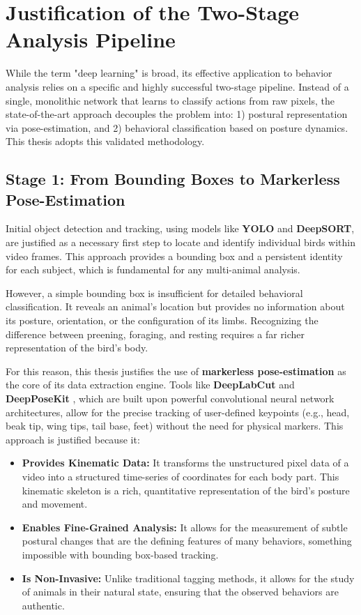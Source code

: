 \section{Justification of the Two-Stage Analysis Pipeline}

While the term "deep learning" is broad, its effective application to behavior analysis relies on a specific and highly successful two-stage pipeline. Instead of a single, monolithic network that learns to classify actions from raw pixels, the state-of-the-art approach decouples the problem into: 1) postural representation via pose-estimation, and 2) behavioral classification based on posture dynamics. This thesis adopts this validated methodology.

\subsection{Stage 1: From Bounding Boxes to Markerless Pose-Estimation}
Initial object detection and tracking, using models like \textbf{YOLO} and \textbf{DeepSORT}, are justified as a necessary first step to locate and identify individual birds within video frames. This approach provides a bounding box and a persistent identity for each subject, which is fundamental for any multi-animal analysis.

However, a simple bounding box is insufficient for detailed behavioral classification. It reveals an animal's location but provides no information about its posture, orientation, or the configuration of its limbs. Recognizing the difference between preening, foraging, and resting requires a far richer representation of the bird's body.

For this reason, this thesis justifies the use of \textbf{markerless pose-estimation} as the core of its data extraction engine. Tools like \textbf{DeepLabCut} and \textbf{DeepPoseKit} , which are built upon powerful convolutional neural network architectures, allow for the precise tracking of user-defined keypoints (e.g., head, beak tip, wing tips, tail base, feet) without the need for physical markers. This approach is justified because it:
\begin{itemize}
    \item \textbf{Provides Kinematic Data:} It transforms the unstructured pixel data of a video into a structured time-series of coordinates for each body part. This kinematic skeleton is a rich, quantitative representation of the bird's posture and movement.
    \item \textbf{Enables Fine-Grained Analysis:} It allows for the measurement of subtle postural changes that are the defining features of many behaviors, something impossible with bounding box-based tracking.
    \item \textbf{Is Non-Invasive:} Unlike traditional tagging methods, it allows for the study of animals in their natural state, ensuring that the observed behaviors are authentic.
\end{itemize}

